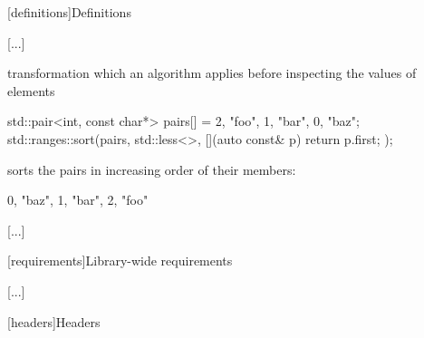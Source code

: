\setcounter{section}{2}
[definitions]{Definitions}

[...]

\begin{addedblock}
\setcounter{subsection}{17}
%
 transformation which an algorithm applies
before inspecting the values of elements

\begin{example}
\begin{codeblock}
std::pair<int, const char*> pairs[] = {{2, "foo"}, {1, "bar"}, {0, "baz"}};
std::ranges::sort(pairs, std::less<>{}, [](auto const& p) { return p.first; });
\end{codeblock}
sorts the pairs in increasing order of their  members:
\begin{codeblock}
{{0, "baz"}, {1, "bar"}, {2, "foo"}}
\end{codeblock}
\end{example}
\end{addedblock}

[...]

\setcounter{section}{4}
[requirements]{Library-wide requirements}

[...]

\setcounter{subsection}{1}
\setcounter{subsubsection}{1}
[headers]{Headers}


